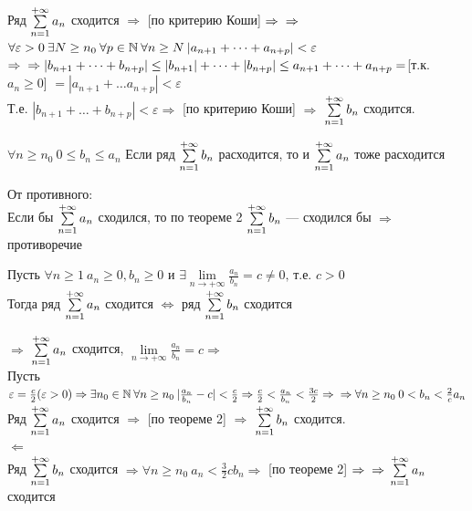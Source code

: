 \begin{Proof}
     Ряд $\sum\limits_{n = 1}^{+\infty}{a_n}$ сходится $\Rightarrow$ [по критерию Коши] $\Rightarrow\\
	\Rightarrow $ \mbox{$\forall \varepsilon > 0 \: \exists N \geq n_0 \: \forall p \in \mathbb{N} \: \forall n \geq N \: |a_{n+1} + \dots + a_{n+p}| < \varepsilon$} $\Rightarrow\\
	\Rightarrow |b_{n+1} + \dots + b_{n+p}| \leq |b_{n+1}| + \dots + |b_{n+p}| \leq a_{n+1} + \dots + a_{n+p} = $[т.к. $a_n \geq 0$] $ = |a_{n+1} + \dots a_{n+p}| < \varepsilon$\\
	Т.е. $|b_{n+1} + \dots + b_{n+p}| < \varepsilon \Rightarrow$ [по критерию Коши] $\Rightarrow $ $\sum\limits_{n = 1}^{+\infty}{b_n}$ сходится.
\end{Proof}

\begin{Seq}
	$\forall n \geq n_0 \: 0 \leq b_n \leq a_n $ Если ряд $\sum\limits_{n = 1}^{+\infty}{b_n}$ расходится, то и $\sum\limits_{n = 1}^{+\infty}{a_n}$ тоже расходится
\end{Seq}

\begin{Proof}
	От противного:\\
	Если бы $\sum\limits_{n = 1}^{+\infty}{a_n}$ сходился, то по теореме 2 $\sum\limits_{n = 1}^{+\infty}{b_n}$ --- сходился бы $\Rightarrow$ противоречие
\end{Proof}

\begin{Th}
	Пусть $\forall n \geq 1 \: a_n \geq 0, b_n \geq 0$ и $\exists \lim\limits_{n \to +\infty}\frac{a_n}{b_n} = c \neq 0 \text{, т.е. } c > 0$\\
	Тогда ряд $\sum\limits_{n = 1}^{+\infty}{a_n}$ сходится $\Leftrightarrow$ ряд $\sum\limits_{n = 1}^{+\infty}{b_n}$ сходится
\end{Th}

\begin{Proof}
	$\Rightarrow$ $\sum\limits_{n = 1}^{+\infty}{a_n}$ сходится, $\lim\limits_{n \to +\infty} \frac{a_n}{b_n} = c \Rightarrow$\\
	Пусть $\varepsilon = \frac{c}{2} (\varepsilon > 0) \Rightarrow \exists n_0 \in \mathbb{N} \: \forall n \geq n_0 \: |\frac{a_n}{b_n} - c| < \frac{c}{2} \Rightarrow \frac{c}{2} < \frac{a_n}{b_n} < \frac{3c}{2} \Rightarrow\\
	\Rightarrow \forall n \geq n_0 \: 0 < b_n < \frac{2}{c}a_n$\\
	Ряд $\sum\limits_{n = 1}^{+\infty}{a_n}$ сходится $\Rightarrow$ [по теореме 2] $\Rightarrow$ $\sum\limits_{n = 1}^{+\infty}{b_n}$ сходится.\\
	$\Leftarrow$\\
	Ряд $\sum\limits_{n = 1}^{+\infty}{b_n}$ сходится $\Rightarrow \forall n \geq n_0 \: a_n < \frac{3}{2}cb_n \Rightarrow$ [по теореме 2] $\Rightarrow\\
	\Rightarrow$ $\sum\limits_{n = 1}^{+\infty}{a_n}$ сходится 
\end{Proof}

